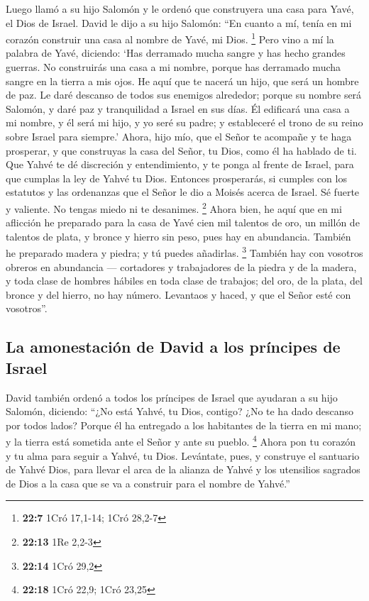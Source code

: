 \begin{paracol}{2}
 Luego llamó a su hijo Salomón y le ordenó que construyera
una casa para Yavé, el Dios de Israel.  David le dijo a su
hijo Salomón: ``En cuanto a mí, tenía en mi corazón construir una casa
al nombre de Yavé, mi Dios. \footnote{\textbf{22:7} 1Cró 17,1-14; 1Cró
  28,2-7}  Pero vino a mí la palabra de Yavé, diciendo:
`Has derramado mucha sangre y has hecho grandes guerras. No construirás
una casa a mi nombre, porque has derramado mucha sangre en la tierra a
mis ojos.  He aquí que te nacerá un hijo, que será un
hombre de paz. Le daré descanso de todos sus enemigos alrededor; porque
su nombre será Salomón, y daré paz y tranquilidad a Israel en sus días.
 Él edificará una casa a mi nombre, y él será mi hijo, y
yo seré su padre; y estableceré el trono de su reino sobre Israel para
siempre.'  Ahora, hijo mío, que el Señor te acompañe y te
haga prosperar, y que construyas la casa del Señor, tu Dios, como él ha
hablado de ti.  Que Yahvé te dé discreción y
entendimiento, y te ponga al frente de Israel, para que cumplas la ley
de Yahvé tu Dios.  Entonces prosperarás, si cumples con
los estatutos y las ordenanzas que el Señor le dio a Moisés acerca de
Israel. Sé fuerte y valiente. No tengas miedo ni te desanimes.
\footnote{\textbf{22:13} 1Re 2,2-3}  Ahora bien, he aquí
que en mi aflicción he preparado para la casa de Yavé cien mil talentos
de oro, un millón de talentos de plata, y bronce y hierro sin peso, pues
hay en abundancia. También he preparado madera y piedra; y tú puedes
añadirlas. \footnote{\textbf{22:14} 1Cró 29,2}  También
hay con vosotros obreros en abundancia --- cortadores y trabajadores de
la piedra y de la madera, y toda clase de hombres hábiles en toda clase
de trabajos;  del oro, de la plata, del bronce y del
hierro, no hay número. Levantaos y haced, y que el Señor esté con
vosotros''.

\hypertarget{la-amonestaciuxf3n-de-david-a-los-pruxedncipes-de-israel}{%
\subsection{La amonestación de David a los príncipes de
Israel}\label{la-amonestaciuxf3n-de-david-a-los-pruxedncipes-de-israel}}

 David también ordenó a todos los príncipes de Israel que
ayudaran a su hijo Salomón, diciendo:  ``¿No está Yahvé,
tu Dios, contigo? ¿No te ha dado descanso por todos lados? Porque él ha
entregado a los habitantes de la tierra en mi mano; y la tierra está
sometida ante el Señor y ante su pueblo. \footnote{\textbf{22:18} 1Cró
  22,9; 1Cró 23,25}  Ahora pon tu corazón y tu alma para
seguir a Yahvé, tu Dios. Levántate, pues, y construye el santuario de
Yahvé Dios, para llevar el arca de la alianza de Yahvé y los utensilios
sagrados de Dios a la casa que se va a construir para el nombre de
Yahvé.''


\end{paracol}
